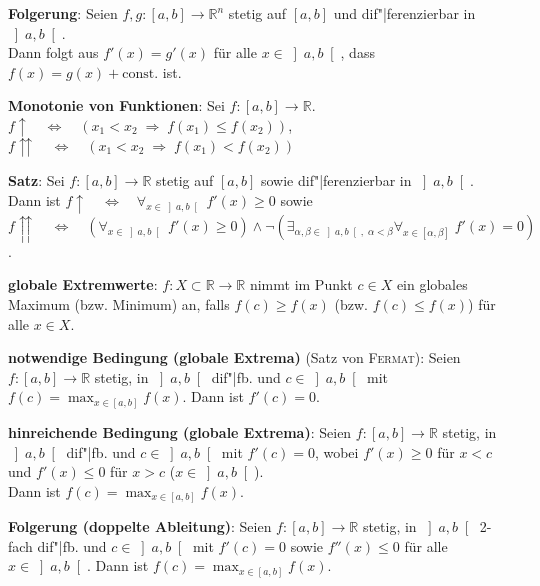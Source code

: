 \textbf{Folgerung}:
Seien $f, g: [a,b] \rightarrow \mathbb{R}^n$ stetig auf $[a,b]$
und dif"|ferenzierbar in $\left]a,b\right[$. \\
Dann folgt aus $f'(x) = g'(x)$ für alle $x \in \left]a,b\right[$, dass
$f(x) = g(x) + \text{const.}$ ist.

\textbf{Monotonie von Funktionen}:
Sei $f: [a,b] \rightarrow \mathbb{R}$. \\
$f\!\!\uparrow \quad\Leftrightarrow\quad
(x_1 < x_2 \;\Rightarrow\; f(x_1) \le f(x_2))$, \qquad
$f\!\!\upuparrows \quad\Leftrightarrow\quad
(x_1 < x_2 \;\Rightarrow\; f(x_1) < f(x_2))$

\textbf{Satz}:
Sei $f: [a,b] \rightarrow \mathbb{R}$ stetig auf $[a,b]$ sowie
dif"|ferenzierbar in $\left]a,b\right[$. \\
Dann ist $f\!\!\uparrow \quad\Leftrightarrow\quad
\forall_{x \in \left]a,b\right[}\; f'(x) \ge 0$ \quad sowie \\
$f\!\!\upuparrows \quad\Leftrightarrow\quad
(\forall_{x \in \left]a,b\right[}\; f'(x) \ge 0) \land
\lnot(\exists_{\alpha, \beta \in \left]a,b\right[,\; \alpha < \beta}
\forall_{x \in [\alpha, \beta]}\; f'(x) = 0)$.

\linie

\textbf{globale Extremwerte}:
$f: X \subset \mathbb{R} \rightarrow \mathbb{R}$ nimmt im Punkt $c \in X$
ein globales Maximum (bzw. Minimum) an, falls
$f(c) \ge f(x)$ (bzw. $f(c) \le f(x)$) für alle $x \in X$.

\textbf{notwendige Bedingung (globale Extrema)} (Satz von \textsc{Fermat}):
Seien $f: [a,b] \rightarrow \mathbb{R}$ stetig, in $\left]a,b\right[$ dif"|fb.
und $c \in \left]a,b\right[$ mit $f(c) = \max_{x \in [a,b]} f(x)$. \qquad
Dann ist $f'(c) = 0$.

\textbf{hinreichende Bedingung (globale Extrema)}:
Seien $f: [a,b] \rightarrow \mathbb{R}$ stetig, in $\left]a,b\right[$ dif"|fb.
und $c \in \left]a,b\right[$ mit $f'(c) = 0$, wobei
$f'(x) \ge 0$ für $x < c$ und $f'(x) \le 0$ für $x > c$
($x \in \left]a,b\right[$). \\
Dann ist $f(c) = \max_{x \in [a,b]} f(x)$.

\textbf{Folgerung (doppelte Ableitung)}:
Seien $f: [a,b] \rightarrow \mathbb{R}$ stetig, in $\left]a,b\right[$ 2-fach
dif"|fb. und $c \in \left]a,b\right[$ mit $f'(c) = 0$ sowie $f''(x) \le 0$ für
alle $x \in \left]a,b\right[$. \qquad
Dann ist $f(c) = \max_{x \in [a,b]} f(x)$.

\linie

\pagebreak

